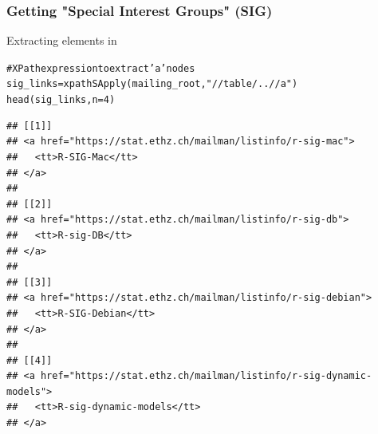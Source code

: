 \documentclass{beamer}\usepackage[]{graphicx}\usepackage[]{color}
\makeatletter
\newcommand{\hlnum}[1]{\textcolor[rgb]{0.063,0.58,0.627}{#1}}%
\newcommand{\hlstr}[1]{\textcolor[rgb]{0.063,0.58,0.627}{#1}}%
\newcommand{\hlcom}[1]{\textcolor[rgb]{0.588,0.588,0.588}{#1}}%
\newcommand{\hlstd}[1]{\textcolor[rgb]{0.196,0.196,0.196}{#1}}%
\newcommand{\hlkwb}[1]{\textcolor[rgb]{0.627,0,0.314}{#1}}%
\newcommand{\hlkwc}[1]{\textcolor[rgb]{0,0.631,0.314}{#1}}%
\newcommand{\hlkwd}[1]{\textcolor[rgb]{0.78,0.227,0.412}{#1}}%
\newenvironment{kframe}{%
 \def\at@end@of@kframe{}%
 \ifinner\ifhmode%
  \def\at@end@of@kframe{\end{minipage}}%
  \begin{minipage}{\columnwidth}%
 \fi\fi%
 \def\FrameCommand##1{\hskip\@totalleftmargin \hskip-\fboxsep
 \colorbox{shadecolor}{##1}\hskip-\fboxsep
     \hskip-\linewidth \hskip-\@totalleftmargin \hskip\columnwidth}%
 \MakeFramed {\advance\hsize-\width
   \@totalleftmargin\z@ \linewidth\hsize
   \@setminipage}}%
 {\par\unskip\endMakeFramed%
 \at@end@of@kframe}
\newenvironment{knitrout}{}{} %
\makeatother
\begin{document}

\begin{frame}[fragile]
\frametitle{Getting "Special Interest Groups" (SIG)}

Extracting  elements in 
\begin{knitrout}\tiny
{}\color{fgcolor}\begin{kframe}
\begin{alltt}
\hlcom{# XPath expression to extract 'a' nodes}
\hlstd{sig_links} \hlkwb{=} \hlkwd{xpathSApply}\hlstd{(mailing_root,} \hlstr{"//table/..//a"}\hlstd{)}
\hlkwd{head}\hlstd{(sig_links,} \hlkwc{n} \hlstd{=} \hlnum{4}\hlstd{)}
\end{alltt}
\begin{verbatim}
## [[1]]
## <a href="https://stat.ethz.ch/mailman/listinfo/r-sig-mac">
##   <tt>R-SIG-Mac</tt>
## </a> 
## 
## [[2]]
## <a href="https://stat.ethz.ch/mailman/listinfo/r-sig-db">
##   <tt>R-sig-DB</tt>
## </a> 
## 
## [[3]]
## <a href="https://stat.ethz.ch/mailman/listinfo/r-sig-debian">
##   <tt>R-SIG-Debian</tt>
## </a> 
## 
## [[4]]
## <a href="https://stat.ethz.ch/mailman/listinfo/r-sig-dynamic-models">
##   <tt>R-sig-dynamic-models</tt>
## </a>
\end{verbatim}
\end{kframe}
\end{knitrout}

\end{frame}

\end{document}
